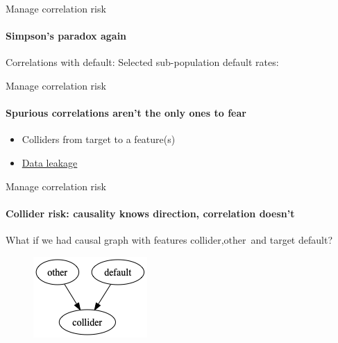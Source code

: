 \begin{frame}{Manage correlation risk}
    \framesubtitle{Simpson's paradox again}
    Correlations with default:
    \newline
    \newline
    \newline
    \newline
    Selected sub-population default rates:
    \newline
    \newline
    \newline

\end{frame}

\begin{frame}{Manage correlation risk}
    \framesubtitle{Spurious correlations aren't the only ones to fear}
    \begin{itemize}
        \item Colliders from target to a feature(s)
        \item \href{https://en.wikipedia.org/wiki/Leakage\_(machine\_learning)}{Data leakage}
    \end{itemize}

\end{frame}

\begin{frame}{Manage correlation risk}
    \framesubtitle{Collider risk: causality knows direction, correlation doesn't}
    What if we had causal graph with features \textrm{collider}$, \textrm{other}$ and target \textrm{default}?
    \newline
    \begin{figure}[ht]
        \includegraphics[height=0.5\textheight]{graphics/default_fork}
    \end{figure}
\end{frame}

